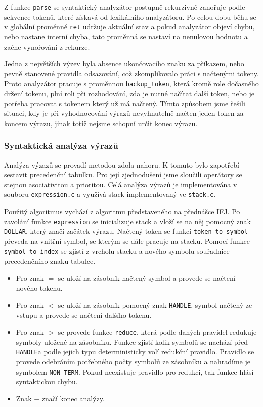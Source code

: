 \documentclass[11pt]{article}
\begin{document}
 Z funkce \texttt{parse} se
 syntaktický analyzátor postupně rekurzivně zanořuje podle sekvence tokenů, které získavá od lexikálního analyzátoru. Po celou
 dobu běhu se v globální proměnné \texttt{ret} udržuje aktuální stav a pokud analyzátor objeví chybu, nebo nastane interní chyba,
 tato proměnná se nastaví na nenulovou hodnotu a začne vynořování z rekurze.

 Jedna z největších výzev byla absence ukončovacího
 znaku za příkazem, nebo pevně stanovené pravidla odsazování, což zkomplikovalo práci s načtenými tokeny. Proto analyzátor pracuje
 s proměnnou \texttt{backup\_token}, která kromě role dočasného držení tokenu, plní roli při rozhodování, zda je nutné načítat
 další token, nebo je potřeba pracovat s tokenem který už má načtený. Tímto způsobem jsme řešili situaci, kdy je při
 vyhodnocování výrazů nevyhnutelně načten jeden token za koncem výrazu, jinak totiž nejsme schopní určit konec výrazu.



\subsubsection{Syntaktická analýza výrazů}
Analýza výzazů se provadí metodou zdola nahoru.
K tomuto bylo zapotřebí sestavit precedenční tabulku. Pro její zjednodušení jsme sloučili operátory
se stejnou asociativitou a prioritou. Celá analýza výrazů je implementována v souboru \texttt{expression.c}
a využívá stack implementovaný ve \texttt{stack.c}.

Použitý algoritmus vychází z algoritmu představeného na přednášce IFJ.
Po zavolání funkce \texttt{expression} se inicializuje stack a vloží se na něj pomocný znak \texttt{DOLLAR},
který značí začátek výrazu. Načtený token se funkcí \texttt{token\_to\_symbol} převeda na vnitřní symbol,
se kterým se dále pracuje na stacku. Pomocí funkce \texttt{symbol\_to\_index} se zjistí z vrcholu stacku
a nového symbolu souřadnice precedenčního znaku tabulce.

\begin{itemize}
    \item Pro znak $=$ se uloží na zásobník načtený symbol a provede se načtení nového tokenu.
    \item Pro znak $<$ se uloží na zásobník pomocný znak \texttt{HANDLE}, symbol načtený ze vstupu
        a provede se načtení dalšího tokenu.
    \item Pro znak $>$ se provede funkce \texttt{reduce},
        která podle daných pravidel redukuje symboly uložené na zásobníku.
        Funkce zjistí kolik symbolů se nachází před \texttt{HANDLE}a podle jejich typu deterministicky volí
        redukční pravidlo. Pravidlo se provede odebráním potřebného počty symbolů ze zásobníku
        a nahradíme je symbolem \texttt{NON\_TERM}.
        Pokud neexistuje pravidlo pro redukci, tak funkce hlásí syntaktickou chybu.
    \item Znak $-$ značí konec analýzy.
\end{itemize}
\end{document}

